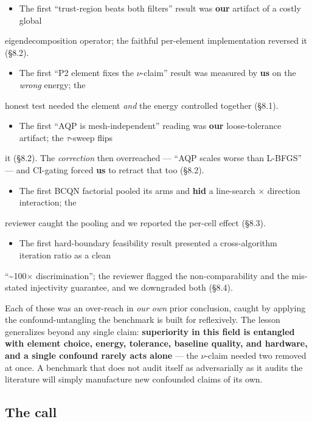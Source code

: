 \documentclass{egpubl}
\begin{document}
\begin{itemize}
  \item The first ``trust-region beats both filters'' result was \textbf{our} artifact of a costly global
\end{itemize}
  eigendecomposition operator; the faithful per-element implementation reversed it (\S8.2).
\begin{itemize}
  \item The first ``P2 element fixes the \texttt{$\nu$}-claim'' result was measured by \textbf{us} on the \emph{wrong} energy; the
\end{itemize}
  honest test needed the element \emph{and} the energy controlled together (\S8.1).
\begin{itemize}
  \item The first ``AQP is mesh-independent'' reading was \textbf{our} loose-tolerance artifact; the $\tau$-sweep flips
\end{itemize}
  it (\S8.2). The \emph{correction} then overreached --- ``AQP scales worse than L-BFGS'' --- and CI-gating forced
  \textbf{us} to retract that too (\S8.2).
\begin{itemize}
  \item The first BCQN factorial pooled its arms and \textbf{hid} a line-search $\times$ direction interaction; the
\end{itemize}
  reviewer caught the pooling and we reported the per-cell effect (\S8.3).
\begin{itemize}
  \item The first hard-boundary feasibility result presented a cross-algorithm iteration ratio as a clean
\end{itemize}
  ``\textasciitilde{}100$\times$ discrimination''; the reviewer flagged the non-comparability and the mis-stated injectivity
  guarantee, and we downgraded both (\S8.4).

Each of these was an over-reach in \emph{our own} prior conclusion, caught by applying the confound-untangling
the benchmark is built for reflexively. The lesson generalizes beyond any single claim: \textbf{superiority
in this field is entangled with element choice, energy, tolerance, baseline quality, and hardware, and
a single confound rarely acts alone} --- the \texttt{$\nu$}-claim needed two removed at once. A benchmark that does
not audit itself as adversarially as it audits the literature will simply manufacture new confounded
claims of its own.

\subsection{The call}
\end{document}
